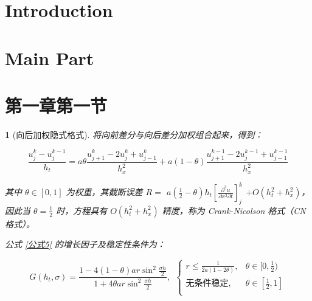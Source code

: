 \documentclass[a4paper]{article}  %
\theoremstyle{MyLineTheoremStyle} %
\theoremstyle{MyBlockTheoremStyle} %
\theoremstyle{MySubsubsectionStyle} %
\newtheorem{definition}{}
\begin{document}
\begin{multicols*}{4} %

















\section{Introduction}  
\lipsum[1] %


\section{Main Part}  
\lipsum[1-4] %


\section{第一章第一节}


\begin{definition}[向后加权隐式格式]

将向前差分与向后差分加权组合起来，得到：

\begin{equation}\label{公式5}
\frac{u_{j}^{k}-u_{j}^{k-1}}{h_t}=a\theta\frac{u_{j+1}^{k}-2u_{j}^{k}+u_{j-1}^{k}}{h_x^2}+a(1-\theta)\frac{u_{j+1}^{k-1}-2u_{j}^{k-1}+u_{j-1}^{k-1}}{h_x^2}
\end{equation}

其中 $\theta \in [0, 1]$ 为权重，其截断误差 $R = $ $a\left(\frac{1}{2}-\theta\right)h_t\left[\frac{\partial^{3}u}{\partial x^{2}\partial t}\right]_{j}^{k} $ $+O(h_t^{2}+h_x^2)$，因此当 $\theta = \frac{1}{2}$ 时，方程具有 $O(h_t^{2}+h_x^2)$ 精度，称为 Crank-Nicolson 格式（CN 格式）。


公式 \ref{公式5} 的增长因子及稳定性条件为：

\begin{equation}
G(h_t,\sigma)=\frac{1-4(1-\theta)ar\sin^2\frac{\sigma h}2}{1+4\theta ar\sin^2\frac{\sigma h}2}, \ \ 
\begin{cases}
    r\leqslant\frac{1}{2a(1-2\theta)}, & \theta \in [0, \frac{1}{2}) \\ 
    \text{无条件稳定}, & \theta \in [\frac{1}{2}, 1] \\ 
\end{cases}
\end{equation}



\end{definition}
\end{multicols*}
\end{document}
